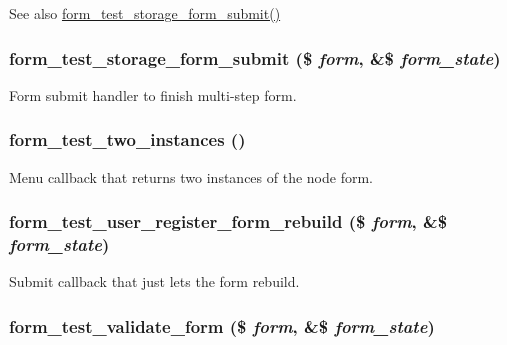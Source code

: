 \begin{DoxySeeAlso}{See also}
\hyperlink{form__test_8module_a52bef39edaea21de604463cd3cb60391}{form\_\-test\_\-storage\_\-form\_\-submit()} 
\end{DoxySeeAlso}
\hypertarget{form__test_8module_a52bef39edaea21de604463cd3cb60391}{
\subsubsection[{form\_\-test\_\-storage\_\-form\_\-submit}]{\setlength{\rightskip}{0pt plus 5cm}form\_\-test\_\-storage\_\-form\_\-submit (\$ {\em form}, \/  \&\$ {\em form\_\-state})}}
\label{form__test_8module_a52bef39edaea21de604463cd3cb60391}
Form submit handler to finish multi-\/step form. \hypertarget{form__test_8module_a38491ab9e989867fe1f2ced9691fbccd}{
\subsubsection[{form\_\-test\_\-two\_\-instances}]{\setlength{\rightskip}{0pt plus 5cm}form\_\-test\_\-two\_\-instances ()}}
\label{form__test_8module_a38491ab9e989867fe1f2ced9691fbccd}
Menu callback that returns two instances of the node form. \hypertarget{form__test_8module_aae1295d3581a492815c1be8bac66daf3}{
\subsubsection[{form\_\-test\_\-user\_\-register\_\-form\_\-rebuild}]{\setlength{\rightskip}{0pt plus 5cm}form\_\-test\_\-user\_\-register\_\-form\_\-rebuild (\$ {\em form}, \/  \&\$ {\em form\_\-state})}}
\label{form__test_8module_aae1295d3581a492815c1be8bac66daf3}
Submit callback that just lets the form rebuild. \hypertarget{form__test_8module_a0407b03ec9fd246fee1c31844bb5ffbc}{
\subsubsection[{form\_\-test\_\-validate\_\-form}]{\setlength{\rightskip}{0pt plus 5cm}form\_\-test\_\-validate\_\-form (\$ {\em form}, \/  \&\$ {\em form\_\-state})}}
